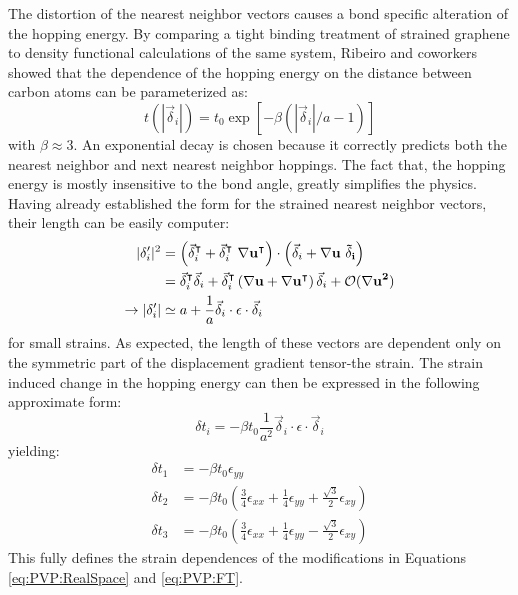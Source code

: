 The distortion of the nearest neighbor vectors causes a bond specific alteration of the hopping energy.
By comparing a tight binding treatment of strained graphene to density functional calculations of the same system, Ribeiro and coworkers showed that the dependence of the hopping energy on the distance between carbon atoms can be parameterized as:
\begin{equation*}
  t(|\vec{\delta}_i|)=t_0 \exp[-\beta (|\vec{\delta}_i|/a-1)]
\end{equation*}
with $\beta\approx 3$\cite{Pereira2009,Ribeiro2009,CastroNeto2009}.
An exponential decay is chosen because it correctly predicts both the nearest neighbor and next nearest neighbor hoppings.
The fact that, the hopping energy is mostly insensitive to the bond angle, greatly simplifies the physics.
Having already established the form for the strained nearest neighbor vectors, their length can be easily computer:
\begin{align*}
  |\delta'_i|^2&=\left(\vec{\delta}_i^{\intercal}+\vec{\delta}_i^{\intercal} \ \bf{\nabla u}^{\intercal} \right) \cdot
    \left(\vec{\delta}_i+\bf{\nabla u} \ \vec{\delta}_i \right) \\
    &=\vec{\delta}_i^{\intercal} \vec{\delta}_i+
      \vec{\delta}_i^{\intercal} \left(\bf{\nabla u}+\bf{\nabla u}^{\intercal} \right) \vec{\delta}_i+
      \mathcal{O}(\bf{\nabla u}^2) \\
  \rightarrow |\delta'_i|&\simeq a+\frac{1}{a} \vec{\delta}_i \cdot \epsilon \cdot \vec{\delta}_i
\end{align*}
for small strains.
As expected, the length of these vectors are dependent only on the symmetric part of the displacement gradient tensor-the strain.
The strain induced change in the hopping energy can then be expressed in the following approximate form:
\begin{equation*}
  \delta t_i=-\beta t_0 \frac{1}{a^2} \vec{\delta}_i \cdot \epsilon \cdot \vec{\delta}_i
\end{equation*}
yielding:
\begin{align*}
  \delta t_1&=-\beta t_0 \epsilon_{yy} \\
  \delta t_2&=-\beta t_0 \left( \frac{3}{4}\epsilon_{xx} +\frac{1}{4} \epsilon_{yy} + \frac{\sqrt{3}}{2} \epsilon_{xy} \right) \\
  \delta t_3&=-\beta t_0 \left( \frac{3}{4}\epsilon_{xx} +\frac{1}{4} \epsilon_{yy} - \frac{\sqrt{3}}{2} \epsilon_{xy} \right) 
\end{align*}
This fully defines the strain dependences of the modifications in Equations \ref{eq:PVP:RealSpace} and \ref{eq:PVP:FT}.





